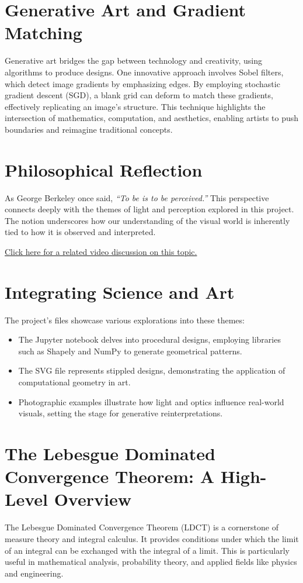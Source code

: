 \documentclass[12pt]{article}
\begin{document}
\section*{Generative Art and Gradient Matching}
Generative art bridges the gap between technology and creativity, using algorithms to produce designs. One innovative approach involves Sobel filters, which detect image gradients by emphasizing edges. By employing stochastic gradient descent (SGD), a blank grid can deform to match these gradients, effectively replicating an image's structure. This technique highlights the intersection of mathematics, computation, and aesthetics, enabling artists to push boundaries and reimagine traditional concepts.

\section*{Philosophical Reflection}
As George Berkeley once said, \emph{\textquotedblleft To be is to be perceived.\textquotedblright} This perspective connects deeply with the themes of light and perception explored in this project. The notion underscores how our understanding of the visual world is inherently tied to how it is observed and interpreted.

\href{https://www.youtube.com/watch?v=idl8TvI-0iw}{Click here for a related video discussion on this topic.}

\section*{Integrating Science and Art}
The project's files showcase various explorations into these themes:

\begin{itemize}
    \item The Jupyter notebook delves into procedural designs, employing libraries such as Shapely and NumPy to generate geometrical patterns.
    \item The SVG file represents stippled designs, demonstrating the application of computational geometry in art.
    \item Photographic examples illustrate how light and optics influence real-world visuals, setting the stage for generative reinterpretations.
\end{itemize}

\section*{The Lebesgue Dominated Convergence Theorem: A High-Level Overview}
The Lebesgue Dominated Convergence Theorem (LDCT) is a cornerstone of measure theory and integral calculus. It provides conditions under which the limit of an integral can be exchanged with the integral of a limit. This is particularly useful in mathematical analysis, probability theory, and applied fields like physics and engineering.
\end{document}
